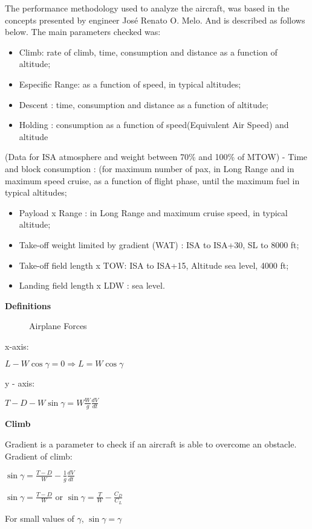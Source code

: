 ﻿The performance methodology used to analyze the aircraft, was based in the concepts presented by engineer José Renato O. Melo. And is described as follows below.
	The main parameters checked was:

\begin{itemize}
  \item Climb: rate of climb, time, consumption and distance as a function of altitude;
  \item Especific Range: as a function of speed, in typical altitudes;
  \item Descent : time, consumption and distance as a function of altitude;
  \item Holding : consumption as a function of speed(Equivalent Air Speed) and altitude
\end{itemize}


       (Data for ISA atmosphere and weight  between 70\% and 100\% of MTOW)
- Time and block consumption :
(for maximum number of pax, in Long Range and in maximum speed cruise, as a function of flight phase, until the maximum fuel in typical altitudes;

\begin{itemize}
  \item Payload x Range : in Long Range and maximum cruise speed, in typical  altitude;
  \item Take-off weight limited by gradient (WAT) : ISA to ISA+30, SL to 8000 ft;
  \item Take-off field length x TOW: ISA to ISA+15, Altitude sea level, 4000 ft;
  \item Landing field length x LDW :  sea level.
\end{itemize}


\textbf{Definitions}

\begin{figure}[H] %
\caption{Airplane Forces}
\label{fig:forces}
\end{figure}

x-axis:

$L-W\cos\gamma = 0 \Rightarrow L = W\cos\gamma$

y - axis:

$T - D - W\sin\gamma = W \frac{W}{g} \frac{dV}{dt} $


\textbf{Climb}

Gradient is a parameter to check if an aircraft is able to overcome an obstacle. Gradient of climb:


$\sin\gamma = \frac{T-D}{W} - \frac{1}{g}\frac{dV}{dt}$

$\sin\gamma = \frac{T-D}{W}$ or $\sin\gamma = \frac{T}{W} - \frac{C_{D}}{C_{L}}$

For small values of $\gamma$, $\sin\gamma = \gamma$
